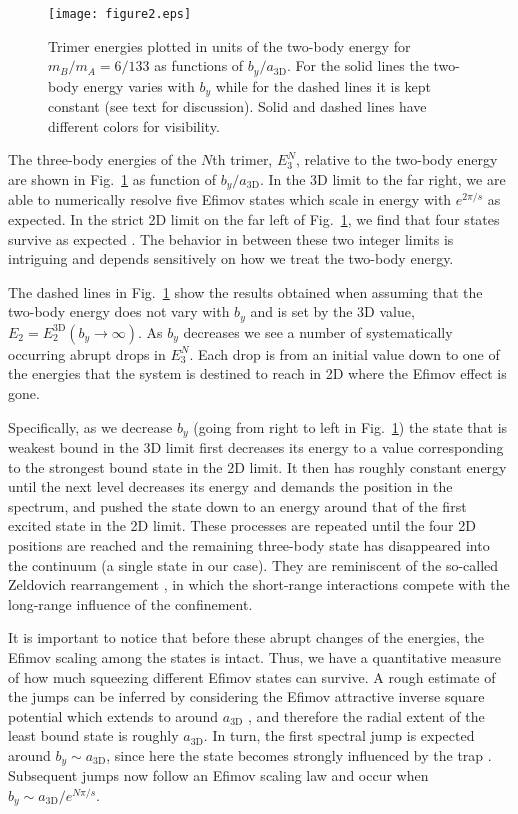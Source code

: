 \documentclass[twocolumn,showpacs,aps,prl,10pt]{revtex4}
\begin{document}
\begin{figure}[ht!]
\texttt{[image: figure2.eps]}
\caption{Trimer energies plotted in units of the 
two-body energy for $m_B/m_A = 6/133$ 
as functions of $b_{y}/a_\textrm{3D}$. For the solid lines
the two-body energy varies with $b_y$ while for 
the dashed lines it is kept constant (see text for discussion).
Solid and dashed lines have different colors for visibility.
}
\label{fig3a}
\end{figure}

The three-body energies of the $N$th trimer,  $ E_{3}^{N}$, 
relative to the two-body energy are shown in 
Fig.~\ref{fig3a} as function of $b_y/a_\textrm{3D}$. 
In the 3D limit to the far right, we are
able to numerically resolve five Efimov states which scale 
in energy with $e^{2\pi/s}$ as expected. In the strict 
2D limit on the far left of Fig.~\ref{fig3a}, we find that 
four states survive as expected \cite{bel11}. The behavior 
in between these two integer limits is intriguing and depends
sensitively on how we treat the two-body energy. 

The dashed lines in Fig.~\ref{fig3a} show the results obtained
when assuming that the two-body energy does not vary with $b_y$
and is set by the 3D value, $E_2=E_{2}^\textrm{3D}(b_y\to \infty)$.
As $b_y$
decreases we see a number of systematically occurring abrupt drops in
$E_{3}^{N}$. Each drop is from an initial value down to one of the energies
that the system is destined to reach in 2D where the Efimov effect is gone.

Specifically, as we decrease $b_y$ (going from right to left in Fig.~\ref{fig3a})
the state that is weakest bound in the 3D limit 
first decreases its energy to a value corresponding to the 
strongest bound state in the 2D limit. It then has roughly constant
energy until the next level decreases its energy and demands the
position in the spectrum, and pushed the state down to an energy
around that of the first excited state in the 2D limit.
These
processes are repeated until the four 2D positions
are reached and the remaining three-body state has
disappeared into the continuum (a single state in our case). 
They are reminiscent of the so-called Zeldovich rearrangement
\cite{zeldovich1960}, in which the short-range interactions compete with 
the long-range influence of the confinement.

It is important to notice that before these abrupt changes 
of the energies, the Efimov scaling among the states is 
intact. Thus, we have a quantitative measure of how much 
squeezing different Efimov states can survive. A rough estimate
of the jumps can be inferred by considering the Efimov 
attractive inverse square potential which extends to 
around $a_\textrm{3D}$ \cite{jensen2004,braaten2006}, and therefore the 
radial extent of the least bound state is roughly $a_\textrm{3D}$.
In turn, the first spectral jump is expected around $b_y\sim a_\textrm{3D}$, 
since here the state becomes strongly influenced by the trap \cite{portegies2011}.
Subsequent jumps now follow an Efimov scaling law and occur when
$b_y\sim a_\textrm{3D}/e^{N\pi/s}$. 
\end{document}
